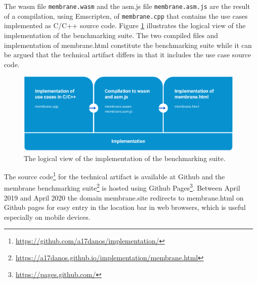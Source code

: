 The wasm file \texttt{membrane.wasm} and the asm.js file \texttt{membrane.asm.js} are the result of a compilation, using Emscripten, of \texttt{membrane.cpp} that contains the use cases implemented as C/C++ source code. Figure \ref{membrane-implementation} illustrates the logical view of the implementation of the benchmarking suite. The two compiled files and implementation of membrane.html constitute the benchmarking suite while it can be argued that the technical artifact differs in that it includes the use case source code.

 
\begin{figure}[!h]
\centering
\includegraphics[width=16cm,keepaspectratio]{figures/membrane-implementation}
\caption{The logical view of the implementation of the benchmarking suite.}
\label{membrane-implementation}
\end{figure}
    
The source code\footnote{\url{https://github.com/a17danos/implementation/}} for the technical artifact is available at Github and the membrane benchmarking suite\footnote{\url{https://a17danos.github.io/implementation/membrane.html}} is hosted using Github Pages\footnote{\url{https://pages.github.com/}}. Between April 2019 and April 2020 the domain membrane.site redirects to membrane.html on Github pages for easy entry in the location bar in web browsers, which is useful especially on mobile devices.

